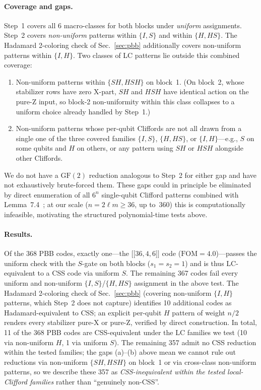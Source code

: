 \documentclass[aps,prxquantum,twocolumn,superscriptaddress,nofootinbib]{revtex4-2}
\newcommand{\dblbrk}[1]{\ensuremath{\lbrack\!\lbrack #1 \rbrack\!\rbrack}}
\newcommand{\code}[1]{\dblbrk{#1}}
\newcommand{\FOM}{\ensuremath{\mathrm{FOM}}}
\begin{document}
\paragraph{Coverage and gaps.}
Step~1 covers all 6 macro-classes for both blocks under \emph{uniform} assignments. Step~2 covers \emph{non-uniform} patterns within $\{I,S\}$ and within $\{H,HS\}$. The Hadamard 2-coloring check of Sec.~\ref{sec:pbb} additionally covers non-uniform patterns within $\{I,H\}$. Two classes of LC patterns lie outside this combined coverage:
\begin{enumerate}
\item[(a)] Non-uniform patterns within $\{SH, HSH\}$ on block~1. (On block~2, whose stabilizer rows have zero X-part, $SH$ and $HSH$ have identical action on the pure-Z input, so block-2 non-uniformity within this class collapses to a uniform choice already handled by Step~1.)
\item[(b)] Non-uniform patterns whose per-qubit Cliffords are not all drawn from a single one of the three covered families $\{I,S\}$, $\{H,HS\}$, or $\{I,H\}$---e.g., $S$ on some qubits and $H$ on others, or any pattern using $SH$ or $HSH$ alongside other Cliffords.
\end{enumerate}
We do not have a $\mathrm{GF}(2)$ reduction analogous to Step~2 for either gap and have not exhaustively brute-forced them.
These gaps could in principle be eliminated by direct enumeration of all $6^n$ single-qubit Clifford patterns combined with Lemma~7.4~\cite[\S7.2]{cross2025small}; at our scale ($n = 2\ell m \geq 36$, up to~$360$) this is computationally infeasible, motivating the structured polynomial-time tests above.

\paragraph{Results.}
Of the 368 PBB codes, exactly one---the $\code{36,4,6}$ code ($\FOM = 4.0$)---passes the uniform check with the $S$-gate on both blocks ($s_1 = s_2 = 1$) and is thus LC-equivalent to a CSS code via uniform $S$.
The remaining 367 codes fail every uniform and non-uniform $\{I,S\}$/$\{H,HS\}$ assignment in the above test.
The Hadamard 2-coloring check of Sec.~\ref{sec:pbb} (covering non-uniform $\{I,H\}$ patterns, which Step~2 does not capture) identifies 10 additional codes as Hadamard-equivalent to CSS; an explicit per-qubit $H$ pattern of weight $n/2$ renders every stabilizer pure-X or pure-Z, verified by direct construction.
In total, 11 of the 368 PBB codes are CSS-equivalent under the LC families we test (10 via non-uniform $H$, 1 via uniform $S$).
The remaining 357 admit no CSS reduction within the tested families; the gaps (a)--(b) above mean we cannot rule out reductions via non-uniform $\{SH,HSH\}$ on block~1 or via cross-class non-uniform patterns, so we describe these 357 as \emph{CSS-inequivalent within the tested local-Clifford families} rather than ``genuinely non-CSS''.
\end{document}
